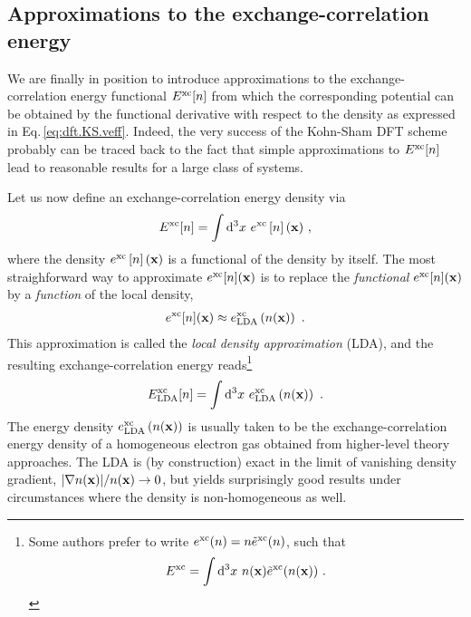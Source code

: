 \subsection{Approximations to the exchange-correlation energy}
\label{sec:dft.approximations}
We are finally in position to introduce approximations to the exchange-correlation energy functional $E^{\rm xc}[n]$ from which the corresponding potential can be obtained by the functional derivative with respect to the density as expressed in Eq.\,\eqref{eq:dft.KS.veff}. Indeed, the very success of the Kohn-Sham DFT scheme probably can be traced back to the fact that simple approximations to $E^{\rm xc}[n]$ lead to reasonable results for a large class of systems. 

Let us now define an exchange-correlation energy density via
\begin{align}
	E^{\rm xc}[n] 
		= \int {\rm d}^3 x ~ e^{\rm xc} \left[ n \right] ({\bf x})~,
\label{eq:dft.xc.1}
\end{align}
where the density $e^{\rm xc} \left[ n \right] ({\bf x})$ is a functional of the density by itself. 
The most straighforward way to approximate $e^{\rm xc}[n] ({\bf x})$ is to replace the \emph{functional} $e^{\rm xc} [n] ({\bf x})$ by a \emph{function} of the local density,
\begin{align}
	e^{\rm xc} [n] ({\bf x})
		\approx e^{\rm xc}_{\rm LDA} \left( n({\bf x}) \right)~.
	\label{eq:dft.exc.lda.1}
\end{align}
This approximation is called the \emph{local density approximation} (LDA), and the resulting exchange-correlation energy reads\footnote{
	Some authors prefer to write $e^{\rm xc}(n) = n \tilde e^{\rm xc} (n)$, such that
	\begin{align*}
		E^{\rm xc} = \int {\rm d}^3 x ~ n({\bf x}) \tilde e^{\rm xc} (n ({\bf x}))~.
	\end{align*}}
\begin{align}
	E^{\rm xc}_{\rm LDA}[n] 
		= \int {\rm d}^3 x ~ e^{\rm xc}_{\rm LDA} \left(n ({\bf x}) \right)~.
	\label{eq:dft.LDA.1}
\end{align}
The energy density $e^{\rm xc}_{\rm LDA} \left(n ({\bf x}) \right)$ is usually taken to be the exchange-correlation energy density of a homogeneous electron gas obtained from higher-level theory approaches. The LDA is (by construction) exact in the limit of vanishing density gradient, $\lvert \nabla n ({\bf x}) \rvert / n({\bf x}) \rightarrow 0$, but yields surprisingly good results under circumstances where the density is non-homogeneous as well.


